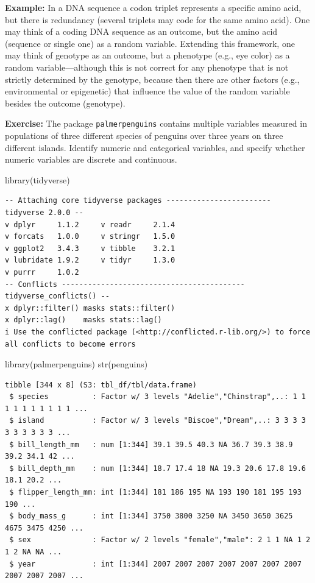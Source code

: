 \documentclass[
  letterpaper,
  DIV=11,
  numbers=noendperiod]{scrreprt}
\newenvironment{Shaded}{\begin{snugshade}}{\end{snugshade}}
\newcommand{\FunctionTok}[1]{\textcolor[rgb]{0.28,0.35,0.67}{#1}}
\newcommand{\NormalTok}[1]{\textcolor[rgb]{0.00,0.23,0.31}{#1}}
\begin{document}
\textbf{Example:} In a DNA sequence a codon triplet represents a
specific amino acid, but there is redundancy (several triplets may code
for the same amino acid). One may think of a coding DNA sequence as an
outcome, but the amino acid (sequence or single one) as a random
variable. Extending this framework, one may think of genotype as an
outcome, but a phenotype (e.g., eye color) as a random
variable---although this is not correct for any phenotype that is not
strictly determined by the genotype, because then there are other
factors (e.g., environmental or epigenetic) that influence the value of
the random variable besides the outcome (genotype).

\textbf{Exercise:} The package \texttt{palmerpenguins} contains multiple
variables measured in populations of three different species of penguins
over three years on three different islands. Identify numeric and
categorical variables, and specify whether numeric variables are
discrete and continuous.

\begin{Shaded}
\begin{Highlighting}[]
\FunctionTok{library}\NormalTok{(tidyverse)}
\end{Highlighting}
\end{Shaded}

\begin{verbatim}
-- Attaching core tidyverse packages ------------------------ tidyverse 2.0.0 --
v dplyr     1.1.2     v readr     2.1.4
v forcats   1.0.0     v stringr   1.5.0
v ggplot2   3.4.3     v tibble    3.2.1
v lubridate 1.9.2     v tidyr     1.3.0
v purrr     1.0.2     
-- Conflicts ------------------------------------------ tidyverse_conflicts() --
x dplyr::filter() masks stats::filter()
x dplyr::lag()    masks stats::lag()
i Use the conflicted package (<http://conflicted.r-lib.org/>) to force all conflicts to become errors
\end{verbatim}

\begin{Shaded}
\begin{Highlighting}[]
\FunctionTok{library}\NormalTok{(palmerpenguins)}
\FunctionTok{str}\NormalTok{(penguins)}
\end{Highlighting}
\end{Shaded}

\begin{verbatim}
tibble [344 x 8] (S3: tbl_df/tbl/data.frame)
 $ species          : Factor w/ 3 levels "Adelie","Chinstrap",..: 1 1 1 1 1 1 1 1 1 1 ...
 $ island           : Factor w/ 3 levels "Biscoe","Dream",..: 3 3 3 3 3 3 3 3 3 3 ...
 $ bill_length_mm   : num [1:344] 39.1 39.5 40.3 NA 36.7 39.3 38.9 39.2 34.1 42 ...
 $ bill_depth_mm    : num [1:344] 18.7 17.4 18 NA 19.3 20.6 17.8 19.6 18.1 20.2 ...
 $ flipper_length_mm: int [1:344] 181 186 195 NA 193 190 181 195 193 190 ...
 $ body_mass_g      : int [1:344] 3750 3800 3250 NA 3450 3650 3625 4675 3475 4250 ...
 $ sex              : Factor w/ 2 levels "female","male": 2 1 1 NA 1 2 1 2 NA NA ...
 $ year             : int [1:344] 2007 2007 2007 2007 2007 2007 2007 2007 2007 2007 ...
\end{verbatim}
\end{document}
